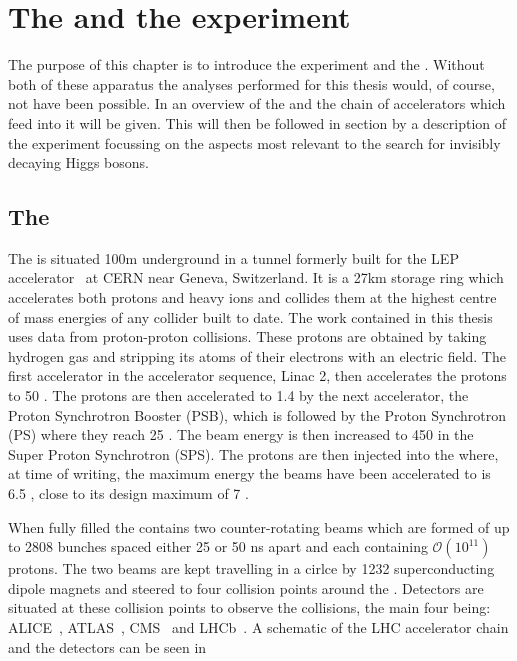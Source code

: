 \chapter{The \LHC and the \CMS experiment}
\label{chap:detector}

The purpose of this chapter is to introduce the \CMS experiment and the \LHC \cite{1748-0221-3-08-S08001}. Without both of these apparatus the analyses performed for this thesis would, of course, not have been possible. In  an overview of the \LHC and the chain of accelerators which feed into it will be given. This will then be followed in section  by a description of the \CMS experiment focussing on the aspects most relevant to the search for invisibly decaying Higgs bosons.

\section{The \LHC}
\label{sec:lhc}
The \LHC is situated 100m underground in a tunnel formerly built for the LEP accelerator~\cite{lepdesign} at CERN near Geneva, Switzerland. It is a 27km storage ring which accelerates both protons and heavy ions and collides them at the highest centre of mass energies of any collider built to date. The work contained in this thesis uses data from proton-proton collisions. These protons are obtained by taking hydrogen gas and stripping its atoms of their electrons with an electric field. The first accelerator in the \LHC accelerator sequence, Linac 2, then accelerates the protons to 50 \MeV. The protons are then accelerated to 1.4 \GeV by the next accelerator, the Proton Synchrotron Booster (PSB), which is followed by the Proton Synchrotron (PS) where they reach 25 \GeV. The beam energy is then increased to 450 \GeV in the Super Proton Synchrotron (SPS). The protons are then injected into the \LHC where, at time of writing, the maximum energy the beams have been accelerated to is 6.5 \TeV, close to its design maximum of 7 \TeV.

When fully filled the \LHC contains two counter-rotating beams which are formed of up to 2808 bunches spaced either 25 or 50 ns apart and each containing $\mathcal{O}(10^{11})$ protons. The two beams are kept travelling in a cirlce by 1232 superconducting dipole magnets and steered to four collision points around the \LHC. Detectors are situated at these collision points to observe the collisions, the main four being: ALICE~\cite{Aamodt:2008zz}, ATLAS~\cite{Aad:1129811}, CMS~\cite{Chatrchyan:2008aa} and LHCb~\cite{Alves:2008zz}. A schematic of the LHC accelerator chain and the detectors can be seen in 

